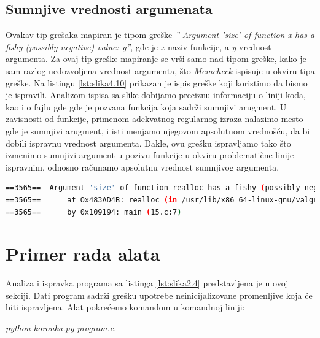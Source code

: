 \documentclass[12pt,oneside]{memoir}
\theoremstyle{plain}
\theoremstyle{definition}
\begin{document}
\subsection{Sumnjive vrednosti argumenata}
Ovakav tip grešaka mapiran je tipom greške \textit{'' Argument 'size' of function x has a fishy (possibly negative) value: y''}, gde je \textit{x} naziv funkcije, a \textit{y} vrednost argumenta. Za ovaj tip greške mapiranje se vrši samo nad tipom greške, kako je sam razlog nedozvoljena vrednost argumenta, što \textit{Memcheck} ispisuje u okviru tipa greške. Na listingu \ref{lst:slika4.10} prikazan je ispis greške koji koristimo da bismo je ispravili. Analizom ispisa sa slike dobijamo preciznu informaciju o liniji koda, kao i o fajlu gde gde je pozvana funkcija koja sadrži sumnjivi arugment. U zavisnosti od funkcije, primenom adekvatnog regularnog izraza nalazimo mesto gde je sumnjivi arugment, i isti menjamo njegovom apsolutnom vrednošću, da bi dobili ispravnu vrednost argumenta. Dakle, ovu grešku ispravljamo tako što izmenimo sumnjivi argument u pozivu funkcije u okviru problematične linije ispravnim, odnosno računamo apsolutnu vrednost sumnjivog argumenta. 


\begin{lstlisting}[style=terminal,caption={Ispis greške sumnjive vrednosti argumenta}, label={lst:slika4.10},language={bash}]   
==3565==  Argument 'size' of function realloc has a fishy (possibly negative) value: -12
==3565==      at Ox483AD4B: realloc (in /usr/lib/x86_64-linux-gnu/valgrind/vgpreload_memcheck-amd64-linux.so) 
==3565==      by 0x109194: main (15.c:7)
\end{lstlisting}

\section{Primer rada alata}
Analiza i ispravka programa sa listinga \ref{lst:slika2.4} predstavljena je u ovoj sekciji. Dati program sadrži grešku upotrebe neinicijalizovane promenljive koja će biti ispravljena. Alat pokrećemo komandom u komandnoj liniji:
\begin{center}
\textit{python koronka.py program.c}.
\end{center}
\end{document}
